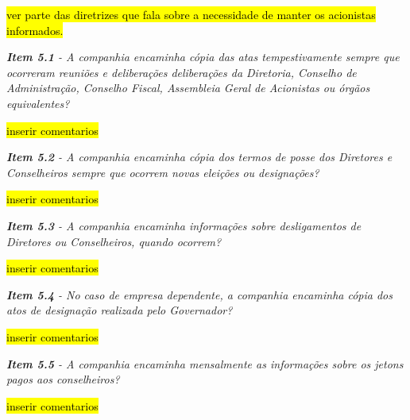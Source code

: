 \hl{ver parte das diretrizes que fala sobre a necessidade de manter os acionistas informados.}

\begin{framed}
\noindent\textit{\textbf{Item 5.1} - A companhia encaminha cópia das atas tempestivamente sempre que ocorreram reuniões e deliberações deliberações da Diretoria, Conselho de Administração, Conselho Fiscal, Assembleia Geral de Acionistas ou órgãos equivalentes?}
\end{framed}

\hl{inserir comentarios}

\begin{framed}
\noindent\textit{\textbf{Item 5.2} - A companhia encaminha cópia dos termos de posse dos Diretores e Conselheiros sempre que ocorrem novas eleições ou designações?}
\end{framed}

\hl{inserir comentarios}

\begin{framed}
\noindent\textit{\textbf{Item 5.3} - A companhia encaminha informações sobre desligamentos de Diretores ou Conselheiros, quando ocorrem?}
\end{framed}

\hl{inserir comentarios}

\begin{framed}
\noindent\textit{\textbf{Item 5.4} - No caso de empresa dependente, a companhia encaminha cópia dos atos de designação realizada pelo Governador?}
\end{framed}

\hl{inserir comentarios}

\begin{framed}
\noindent\textit{\textbf{Item 5.5} - A companhia encaminha mensalmente  as informações sobre os jetons pagos aos conselheiros?}
\end{framed}

\hl{inserir comentarios}
